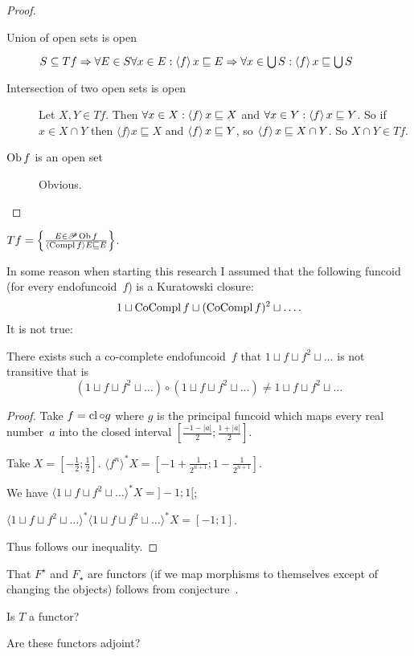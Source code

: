 \begin{proof}
  
  \begin{description}
    \item[Union of open sets is open] $S \subseteq T f \Rightarrow \forall E
    \in S \forall x \in E : \left\langle f\right\rangle x \sqsubseteq E \Rightarrow
    \forall x \in \bigcup S : \left\langle f\right\rangle x \sqsubseteq \bigcup S$
    
    \item[Intersection of two open sets is open] Let $X, Y \in T f$. Then
    $\forall x \in X : \left\langle f\right\rangle x \sqsubseteq X$ and $\forall x \in Y
    : \left\langle f\right\rangle x \sqsubseteq Y$. So if $x \in X \cap Y$ then $\langle
    f \rangle x \sqsubseteq X$ and $\left\langle f\right\rangle x \sqsubseteq Y$, so
    $\left\langle f\right\rangle x \sqsubseteq X \cap Y$. So $X \cap Y \in T f$.
    
    \item[$\operatorname{Ob} f$ is an open set] Obvious.
  \end{description}
\end{proof}

\begin{obvious}
$T f = \left\{ \frac{ E \in \mathscr{P} \operatorname{Ob} f }{ \langle
\operatorname{Compl} f \rangle E \sqsubseteq E }\right\}$.
\end{obvious}

In some reason when starting this research I assumed that the
following funcoid (for every endofuncoid~$f$) is a Kuratowski closure:
\[
1 \sqcup \operatorname{CoCompl} f \sqcup (\operatorname{CoCompl} f)^2 \sqcup \ldots.
\]
It is not true:

\begin{example}
There exists such a co-complete endofuncoid~$f$ that
$1 \sqcup f \sqcup f^2 \sqcup \ldots$ is not transitive that
is
\[(1 \sqcup f \sqcup f^2 \sqcup \ldots)\circ
(1 \sqcup f \sqcup f^2 \sqcup \ldots) \ne
1 \sqcup f \sqcup f^2 \sqcup \ldots
\]
\end{example}

\begin{proof}
Take $f=\operatorname{cl}\circ g$ where $g$ is the principal funcoid which maps
every real number~$a$ into the closed interval
$\left[ \frac{- 1 - | a |}{2} ; \frac{1 + | a |}{2} \right]$.

Take $X = \left[ - \frac{1}{2} ; \frac{1}{2} \right]$. $\langle f^n
\rangle^{\ast} X = \left[ - 1 + \frac{1}{2^{n + 1}} ; 1 - \frac{1}{2^{n + 1}}
\right]$.

We have $\langle 1 \sqcup f \sqcup f^2 \sqcup \ldots \rangle^{\ast} X =] - 1 ;
1 [$;

$\langle 1 \sqcup f \sqcup f^2 \sqcup \ldots \rangle^{\ast} \langle 1 \sqcup f
\sqcup f^2 \sqcup \ldots \rangle^{\ast} X = [- 1 ; 1]$.

Thus follows our inequality.
\end{proof}

That $F^{\star}$ and $F_{\star}$ are functors (if we map morphisms to
themselves except of changing the objects) follows from
conjecture~.

Is $T$ a functor?

Are these functors adjoint?
